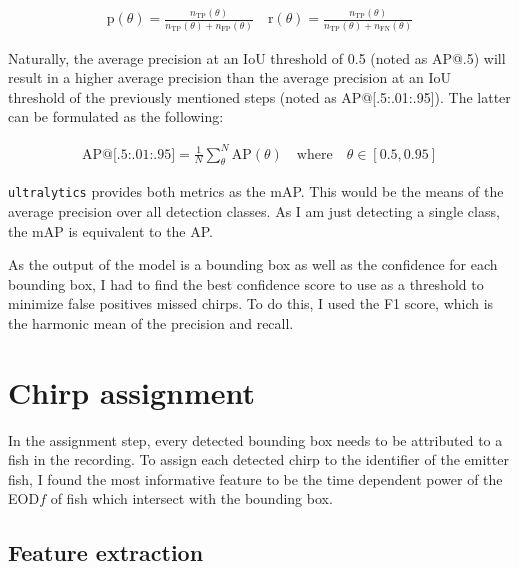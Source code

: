 \begin{equation}
  \begin{aligned}
    \text{p}(\theta) = \frac{n_{\text{TP}}(\theta)}{n_{\text{TP}}(\theta) + n_{\text{FP}}(\theta)} \quad \text{r}(\theta) = \frac{n_{\text{TP}}(\theta)}{n_{\text{TP}}(\theta) + n_{\text{FN}}(\theta)} 
  \end{aligned}
  \label{eq:ap}
\end{equation}

Naturally, the average precision at an IoU threshold of 0.5 (noted as
AP@.5) will result in a higher average precision than the average precision at
an IoU threshold of the previously mentioned steps (noted as
AP@[.5:.01:.95]). The latter can be formulated as the following:

\begin{equation}
  \begin{aligned}
    \text{AP@[.5:.01:.95]} = \frac{1}{N} \sum_{\theta}^{N} \text{AP}(\theta) \quad \text{where} \quad \theta \in [0.5, 0.95]
  \end{aligned}
  \label{eq:fancyap}
\end{equation}

\texttt{ultralytics} provides both metrics as the \acrfull{mAP}. This would be
the means of the average precision over all detection classes. As I am just
detecting a single class, the mAP is equivalent to the AP.

As the output of the model is a bounding box as well as the confidence for each
bounding box, I had to find the best confidence score to use as a threshold to
minimize false positives missed chirps. To do this, I used the F1 score, which
is the harmonic mean of the precision and recall.

\section{Chirp assignment}

In the assignment step, every detected bounding box needs to be attributed to a
fish in the recording. To assign each detected chirp to the identifier of the
emitter fish, I found the most informative feature to be the time dependent
power of the EOD$f$ of fish which intersect with the bounding box.

\subsection{Feature extraction}

